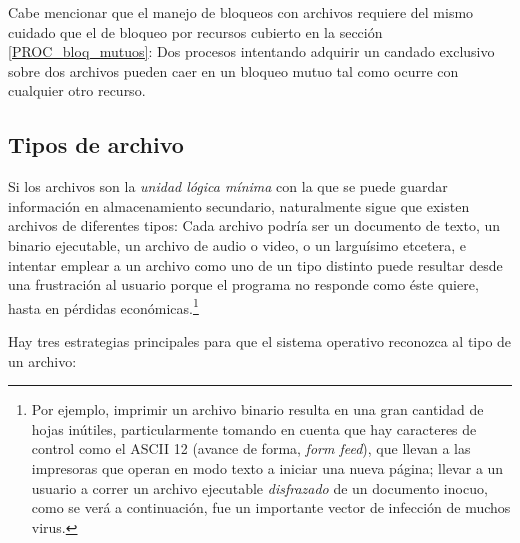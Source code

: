 \documentclass[11pt,fleqn]{book} %
\begin{document}
Cabe mencionar que el manejo de bloqueos con archivos requiere del
mismo cuidado que el de bloqueo por recursos cubierto en la
sección \ref{PROC_bloq_mutuos}: Dos procesos intentando adquirir un
candado exclusivo sobre dos archivos pueden caer en un bloqueo mutuo
tal como ocurre con cualquier otro recurso.
\subsection{Tipos de archivo}
\label{sec-6-2-4}


Si los archivos son la \emph{unidad lógica mínima} con la
que se puede guardar información en almacenamiento secundario,
naturalmente sigue que existen archivos de diferentes tipos: Cada
archivo podría ser un documento de texto, un binario ejecutable, un
archivo de audio o video, o un larguísimo etcetera, e intentar emplear
a un archivo como uno de un tipo distinto puede resultar desde una
frustración al usuario porque el programa no responde como éste
quiere, hasta en pérdidas económicas.\footnote{Por ejemplo, imprimir un
archivo binario resulta en una gran cantidad de hojas inútiles,
particularmente tomando en cuenta que hay caracteres de control como
el ASCII 12 (avance de forma, \emph{form feed}), que llevan a las
impresoras que operan en modo texto a iniciar una nueva página; llevar
a un usuario a correr un archivo ejecutable \emph{disfrazado} de un
documento inocuo, como se verá a continuación, fue un importante
vector de infección de muchos virus. }

Hay tres estrategias principales para que el sistema operativo
reconozca al tipo de un archivo:
\end{document}
